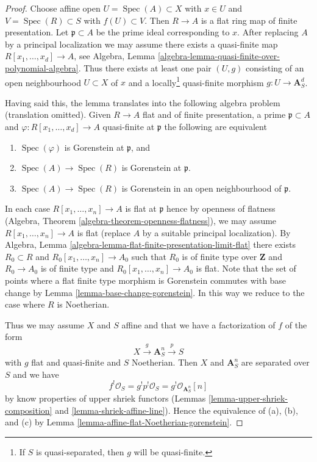 \documentclass{stacks-project}
\theoremstyle{plain}
\theoremstyle{definition}
\theoremstyle{remark}
\numberwithin{equation}{subsection}
\def\Spec{\mathop{\mathrm{Spec}}}
\begin{document}
\begin{proof}
Choose affine open $U = \Spec(A) \subset X$ with $x \in U$ and
$V = \Spec(R) \subset S$ with $f(U) \subset V$. Then $R \to A$
is a flat ring map of finite presentation. Let $\mathfrak p \subset A$
be the prime ideal corresponding to $x$. After replacing $A$ by a
principal localization we may assume there exists a quasi-finite map
$R[x_1, \ldots, x_d]  \to A$, see
Algebra, Lemma \ref{algebra-lemma-quasi-finite-over-polynomial-algebra}.
Thus there exists at least one pair $(U, g)$ consisting of an
open neighbourhood $U \subset X$ of $x$ and a locally\footnote{If $S$
is quasi-separated, then $g$ will be quasi-finite.} quasi-finite morphism
$g : U \to \mathbf{A}^d_S$.

\medskip\noindent
Having said this, the lemma translates into the following algebra
problem (translation omitted). Given $R \to A$ flat and of finite
presentation, a prime $\mathfrak p \subset A$ and
$\varphi : R[x_1, \ldots, x_d] \to A$ quasi-finite at $\mathfrak p$
the following are equivalent
\begin{enumerate}
\item[(a)] $\Spec(\varphi)$ is Gorenstein at $\mathfrak p$, and
\item[(b)] $\Spec(A) \to \Spec(R)$ is Gorenstein at $\mathfrak p$.
\item[(c)] $\Spec(A) \to \Spec(R)$ is Gorenstein in an open neighbourhood
of $\mathfrak p$.
\end{enumerate}
In each case $R[x_1, \ldots, x_n] \to A$ is flat at $\mathfrak p$
hence by openness of flatness
(Algebra, Theorem \ref{algebra-theorem-openness-flatness}),
we may assume $R[x_1, \ldots, x_n] \to A$
is flat (replace $A$ by a suitable principal localization).
By Algebra, Lemma \ref{algebra-lemma-flat-finite-presentation-limit-flat}
there exists $R_0 \subset R$ and $R_0[x_1, \ldots, x_n] \to A_0$
such that $R_0$ is of finite type over $\mathbf{Z}$ and
$R_0 \to A_0$ is of finite type and $R_0[x_1, \ldots, x_n] \to A_0$ is flat.
Note that the set of points where a flat finite type morphism
is Gorenstein commutes with base change by
Lemma \ref{lemma-base-change-gorenstein}.
In this way we reduce to the case where $R$ is Noetherian.

\medskip\noindent
Thus we may assume $X$ and $S$ affine and that
we have a factorization of $f$ of the form
$$
X \xrightarrow{g} \mathbf{A}^n_S \xrightarrow{p} S
$$
with $g$ flat and quasi-finite and $S$ Noetherian. Then $X$ and
$\mathbf{A}^n_S$ are separated over $S$ and we have
$$
f^!\mathcal{O}_S = g^!p^!\mathcal{O}_S = g^!\mathcal{O}_{\mathbf{A}^n_S}[n]
$$
by know properties of upper shriek functors
(Lemmas \ref{lemma-upper-shriek-composition} and
\ref{lemma-shriek-affine-line}).
Hence the equivalence of (a), (b), and (c) by
Lemma \ref{lemma-affine-flat-Noetherian-gorenstein}.
\end{proof}
\end{document}
